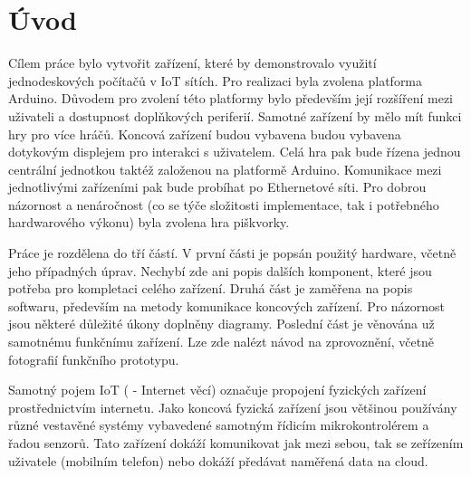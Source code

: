 \section{Úvod}
Cílem práce bylo vytvořit zařízení, které by demonstrovalo využití jednodeskových počítačů v IoT sítích. Pro realizaci byla zvolena platforma Arduino. Důvodem pro zvolení této platformy bylo především její rozšíření mezi uživateli a dostupnost doplňkových periferií. Samotné zařízení by mělo mít funkci hry pro více hráčů. Koncová zařízení budou vybavena budou vybavena dotykovým displejem pro interakci s uživatelem. Celá hra pak bude řízena jednou centrální jednotkou taktéž založenou na platformě Arduino. Komunikace mezi jednotlivými zařízeními pak bude probíhat po Ethernetové síti. Pro dobrou názornost a nenáročnost (co se týče složitosti implementace, tak i potřebného hardwarového výkonu) byla zvolena hra piškvorky.

Práce je rozdělena do tří částí. V první části je popsán použitý hardware, včetně jeho případných úprav. Nechybí zde ani popis dalších komponent, které jsou potřeba pro kompletaci celého zařízení. Druhá část je zaměřena na popis softwaru, především na metody komunikace koncových zařízení. Pro názornost jsou některé důležité úkony doplněny diagramy. Poslední část je věnována už samotnému funkčnímu zařízení. Lze zde nalézt návod na zprovoznění, včetně fotografií funkčního prototypu.


Samotný pojem IoT ( - Internet věcí) označuje propojení fyzických zařízení prostřednictvím internetu. Jako koncová fyzická zařízení jsou většinou používány různé vestavěné systémy vybavedené samotným řídicím mikrokontrolérem a řadou senzorů. Tato zařízení dokáží komunikovat jak mezi sebou, tak se zeřízením uživatele (mobilním telefon) nebo dokáží předávat naměřená data na cloud.


